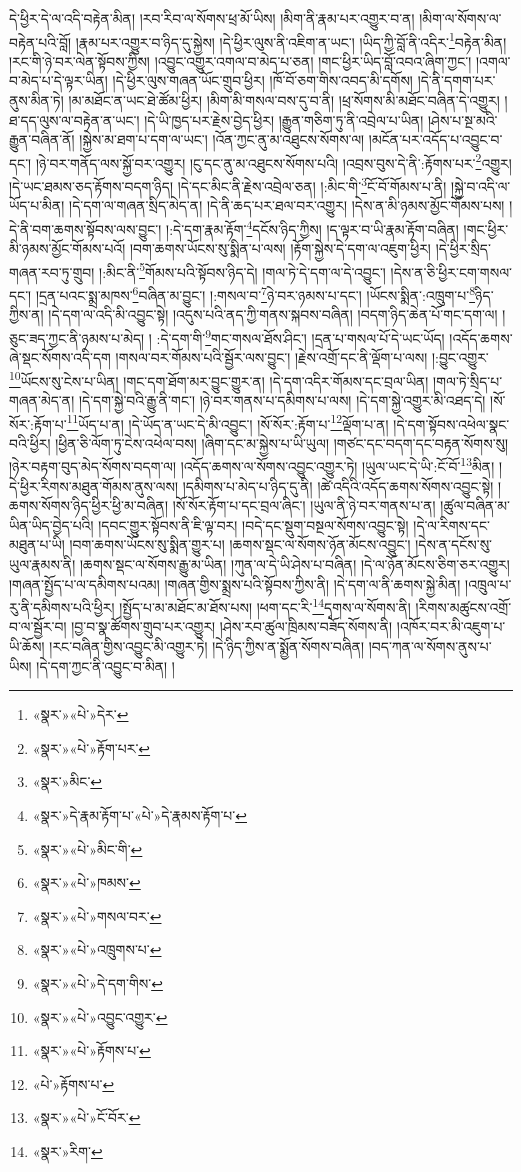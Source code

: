 དེ་ཕྱིར་དེ་ལ་འདི་བརྟེན་མིན། །རབ་རིབ་ལ་སོགས་ཕྲ་མོ་ཡིས། །མིག་ནི་རྣམ་པར་འགྱུར་བ་ན། །མིག་ལ་སོགས་ལ་བརྟེན་པའི་བློ། །རྣམ་པར་འགྱུར་བ་ཉིད་དུ་སྐྱེས། །དེ་ཕྱིར་ལུས་ནི་འཇིག་ན་ཡང་། །ཡིད་ཀྱི་བློ་ནི་འདིར་\footnote{«སྣར་»«པེ་»དེར་}བརྟེན་མིན། །རང་གི་ཉེ་བར་ལེན་སྟོབས་ཀྱིས། །འབྱུང་འགྱུར་འགལ་བ་མེད་པ་ཅན། །གང་ཕྱིར་ཡིད་བློ་འབའ་ཞིག་ཀྱང་། །འགལ་བ་མེད་པ་དེ་ལྟར་ཡིན། །དེ་ཕྱིར་ལུས་གཞན་ཡོང་གྲུབ་ཕྱིར། །ཁོ་བོ་ཅག་གིས་འབད་མི་དགོས། །དེ་ནི་དགག་པར་ནུས་མིན་ཏེ། །མ་མཐོང་ན་ཡང་ཐེ་ཚོམ་ཕྱིར། །མིག་མི་གསལ་བས་དུ་བ་ནི། །ཕྲ་སོགས་མི་མཐོང་བཞིན་དེ་འགྱུར། །ཐ་དད་ལུས་ལ་བརྟེན་ན་ཡང་། །དེ་ཡི་ཁྱད་པར་རྗེས་བྱེད་ཕྱིར། །རྒྱུན་གཅིག་ཏུ་ནི་འབྲེལ་པ་ཡིན། །ཤེས་པ་སྔ་མའི་རྒྱུན་བཞིན་ནོ། །སྐྱེས་མ་ཐག་པ་དག་ལ་ཡང་། །འོན་ཀྱང་ནུ་མ་འཐུངས་སོགས་ལ། །མངོན་པར་འདོད་པ་འབྱུང་བ་དང་། །ཉེ་བར་གནོད་ལས་སྐྱོ་བར་འགྱུར། །ངུ་དང་ནུ་མ་འཐུངས་སོགས་པའི། །འབྲས་བུས་དེ་ནི་:རྟོགས་པར་\footnote{«སྣར་»«པེ་»རྟོག་པར་}འགྱུར། །དེ་ཡང་ཐམས་ཅད་རྟོགས་བདག་ཉིད། །དེ་དང་མིང་ནི་རྗེས་འབྲེལ་ཅན། །:མིང་གི་\footnote{«སྣར་»མིང་}ངོ་བོ་གོམས་པ་ནི། །སྐྱེ་བ་འདི་ལ་ཡོད་པ་མིན། །དེ་དག་ལ་གཞན་སྲིད་མེད་ན། །དེ་ནི་ཆད་པར་ཐལ་བར་འགྱུར། །དེས་ན་མི་ཉམས་མྱོང་གོམས་པས། །དེ་ནི་བག་ཆགས་སྟོབས་ལས་བྱུང་། །:དེ་དག་རྣམ་རྟོག་\footnote{«སྣར་»དེ་རྣམ་རྟོག་པ་«པེ་»དེ་རྣམས་རྟོག་པ་}དངོས་ཉིད་ཀྱིས། །ད་ལྟར་བ་ཡི་རྣམ་རྟོག་བཞིན། །གང་ཕྱིར་མི་ཉམས་མྱོང་གོམས་པའོ། །བག་ཆགས་ཡོངས་སུ་སྨིན་པ་ལས། །རྟོག་སྐྱེས་དེ་དག་ལ་འཇུག་ཕྱིར། །དེ་ཕྱིར་སྲིད་གཞན་རབ་ཏུ་གྲུབ། །:མིང་ནི་\footnote{«སྣར་»«པེ་»མིང་གི་}གོམས་པའི་སྟོབས་ཉིད་དེ། །གལ་ཏེ་དེ་དག་ལ་དེ་འབྱུང་། །དེས་ན་ཅི་ཕྱིར་ངག་གསལ་དང་། །དྲན་པའང་སྨྲ་མཁས་\footnote{«སྣར་»«པེ་»ཁམས་}བཞིན་མ་བྱུང་། །:གསལ་བ་\footnote{«སྣར་»«པེ་»གསལ་བར་}ཉེ་བར་ཉམས་པ་དང་། །ཡོངས་སྨིན་:འཁྲུག་པ་\footnote{«སྣར་»«པེ་»འཁྲུགས་པ་}ཉིད་ཀྱིས་ན། །དེ་དག་ལ་འདི་མི་འབྱུང་སྟེ། །འདུས་པའི་ནད་ཀྱི་གནས་སྐབས་བཞིན། །བདག་ཉིད་ཆེན་པོ་གང་དག་ལ། །ཅུང་ཟད་ཀྱང་ནི་ཉམས་པ་མེད། །
:དེ་དག་གི་\footnote{«སྣར་»«པེ་»དེ་དག་གིས་}གང་གསལ་ཐོས་ཤིང་། །དྲན་པ་གསལ་པོ་དེ་ཡང་ཡོད། །འདོད་ཆགས་ཞེ་སྡང་སོགས་འདི་དག །གསལ་བར་གོམས་པའི་སྦྱོར་ལས་བྱུང་། །རྗེས་འགྲོ་དང་ནི་ལྡོག་པ་ལས། །:བྱུང་འགྱུར་\footnote{«སྣར་»«པེ་»འབྱུང་འགྱུར་}ཡོངས་སུ་ངེས་པ་ཡིན། །གང་དག་ཐོག་མར་བྱུང་གྱུར་ན། །དེ་དག་འདིར་གོམས་དང་བྲལ་ཡིན། །གལ་ཏེ་སྲིད་པ་གཞན་མེད་ན། །དེ་དག་སྐྱེ་བའི་རྒྱུ་ནི་གང་། །ཉེ་བར་གནས་པ་དམིགས་པ་ལས། །དེ་དག་སྐྱེ་འགྱུར་མི་འཐད་དེ། །སོ་སོར་:རྟོག་པ་\footnote{«སྣར་»«པེ་»རྟོགས་པ་}ཡོད་པ་ན། །དེ་ཡོད་ན་ཡང་དེ་མི་འབྱུང་། །སོ་སོར་:རྟོག་པ་\footnote{«པེ་»རྟོགས་པ་}ལྡོག་པ་ན། །དེ་དག་སྟོབས་འཕེལ་སྣང་བའི་ཕྱིར། །ཕྱིན་ཅི་ལོག་ཏུ་ངེས་འཕེལ་བས། །ཞིག་དང་མ་སྐྱེས་པ་ཡི་ཡུལ། །གཙང་དང་བདག་དང་བརྟན་སོགས་སུ། །ཉེར་བརྟག་བུད་མེད་སོགས་བདག་ལ། །འདོད་ཆགས་ལ་སོགས་འབྱུང་འགྱུར་ཏེ། །ཡུལ་ཡང་དེ་ཡི་:ངོ་བོ་\footnote{«སྣར་»«པེ་»ངོ་བོར་}མིན། །དེ་ཕྱིར་རིགས་མཐུན་གོམས་ནུས་ལས། །དམིགས་པ་མེད་པ་ཉིད་དུ་ནི། །ཚེ་འདིའི་འདོད་ཆགས་སོགས་འབྱུང་སྟེ། །ཆགས་སོགས་ཉིད་ཕྱིར་ཕྱི་མ་བཞིན། །སོ་སོར་རྟོག་པ་དང་བྲལ་ཞིང་། །ཡུལ་ནི་ཉེ་བར་གནས་པ་ན། །ཚུལ་བཞིན་མ་ཡིན་ཡིད་བྱེད་པའི། །དབང་གྱུར་སྟོབས་ནི་ཇི་ལྟ་བར། །བདེ་དང་སྡུག་བསྔལ་སོགས་འབྱུང་སྟེ། །དེ་ལ་རིགས་དང་མཐུན་པ་ཡི། །བག་ཆགས་ཡོངས་སུ་སྨིན་གྱུར་པ། །ཆགས་སྡང་ལ་སོགས་ཉོན་མོངས་འབྱུང་། །དེས་ན་དངོས་སུ་ཡུལ་རྣམས་ནི། །ཆགས་སྡང་ལ་སོགས་རྒྱུ་མ་ཡིན། །ཀུན་ལ་དེ་ཡི་ཤེས་པ་བཞིན། །དེ་ལ་ཉོན་མོངས་ཅིག་ཅར་འགྱུར། །གཞན་སྤྱོད་པ་ལ་དམིགས་པའམ། །གཞན་གྱིས་སྨྲས་པའི་སྟོབས་ཀྱིས་ནི། །དེ་དག་ལ་ནི་ཆགས་སྐྱེ་མིན། །འཁྲུལ་པ་རུ་ནི་དམིགས་པའི་ཕྱིར། །སྤྱོད་པ་མ་མཐོང་མ་ཐོས་པས། །ཕག་དང་རི་\footnote{«སྣར་»རིག་}དྭགས་ལ་སོགས་ནི། །རིགས་མཚུངས་འགྲོ་བ་ལ་སྦྱོར་བ། །བྱ་བ་སྣ་ཚོགས་གྲུབ་པར་འགྱུར། །ཤེས་རབ་ཚུལ་ཁྲིམས་བཟོད་སོགས་ནི། །འཁོར་བར་མི་འཇུག་པ་ཡི་ཆོས། །རང་བཞིན་གྱིས་འབྱུང་མི་འགྱུར་ཏེ། །དེ་ཉིད་ཀྱིས་ན་སྨྱོན་སོགས་བཞིན། །བད་ཀན་ལ་སོགས་ནུས་པ་ཡིས། །དེ་དག་ཀྱང་ནི་འབྱུང་བ་མིན། །
